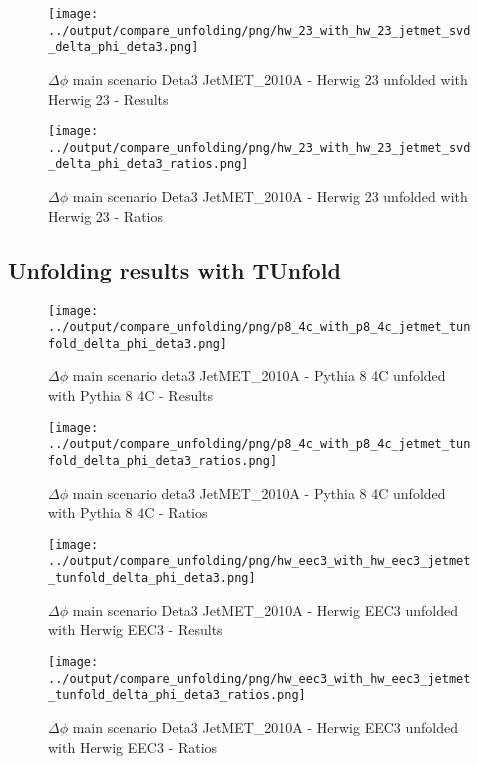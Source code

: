 \documentclass[11pt]{book}
\begin{document}
\begin{figure}[ht]
\centering
\texttt{[image: ../output/compare\_unfolding/png/hw\_23\_with\_hw\_23\_jetmet\_svd\_delta\_phi\_deta3.png]}
\caption{$\Delta\phi$ main scenario Deta3 JetMET\_2010A - Herwig 23 unfolded with Herwig 23 - Results}
\label{hw_23_hw_23_jetmet_svd_delta_phi_deta3_a}
\end{figure}

\begin{figure}[ht]
\centering
\texttt{[image: ../output/compare\_unfolding/png/hw\_23\_with\_hw\_23\_jetmet\_svd\_delta\_phi\_deta3\_ratios.png]}
\caption{$\Delta\phi$ main scenario Deta3 JetMET\_2010A - Herwig 23 unfolded with Herwig 23 - Ratios}
\label{hw_23_hw_23_jetmet_svd_delta_phi_deta3_b}
\end{figure}


\clearpage
\subsection{Unfolding results with TUnfold}

\begin{figure}[ht]
\centering
\texttt{[image: ../output/compare\_unfolding/png/p8\_4c\_with\_p8\_4c\_jetmet\_tunfold\_delta\_phi\_deta3.png]}
\caption{$\Delta\phi$ main scenario deta3 JetMET\_2010A - Pythia 8 4C unfolded with Pythia 8 4C - Results}
\label{p8_p8_jetmet_tunfold_delta_phi_deta3_a}
\end{figure}

\begin{figure}[ht]
\centering
\texttt{[image: ../output/compare\_unfolding/png/p8\_4c\_with\_p8\_4c\_jetmet\_tunfold\_delta\_phi\_deta3\_ratios.png]}
\caption{$\Delta\phi$ main scenario deta3 JetMET\_2010A - Pythia 8 4C unfolded with Pythia 8 4C - Ratios}
\label{p8_p8_jetmet_tunfold_delta_phi_deta3_b}
\end{figure}

\begin{figure}[ht]
\centering
\texttt{[image: ../output/compare\_unfolding/png/hw\_eec3\_with\_hw\_eec3\_jetmet\_tunfold\_delta\_phi\_deta3.png]}
\caption{$\Delta\phi$ main scenario Deta3 JetMET\_2010A - Herwig EEC3 unfolded with Herwig EEC3 - Results}
\label{hw_eec3_hw_eec3_jetmet_tunfold_delta_phi_deta3_a}
\end{figure}

\begin{figure}[ht]
\centering
\texttt{[image: ../output/compare\_unfolding/png/hw\_eec3\_with\_hw\_eec3\_jetmet\_tunfold\_delta\_phi\_deta3\_ratios.png]}
\caption{$\Delta\phi$ main scenario Deta3 JetMET\_2010A - Herwig EEC3 unfolded with Herwig EEC3 - Ratios}
\label{hw_eec3_hw_eec3_jetmet_tunfold_delta_phi_deta3_b}
\end{figure}
\end{document}
